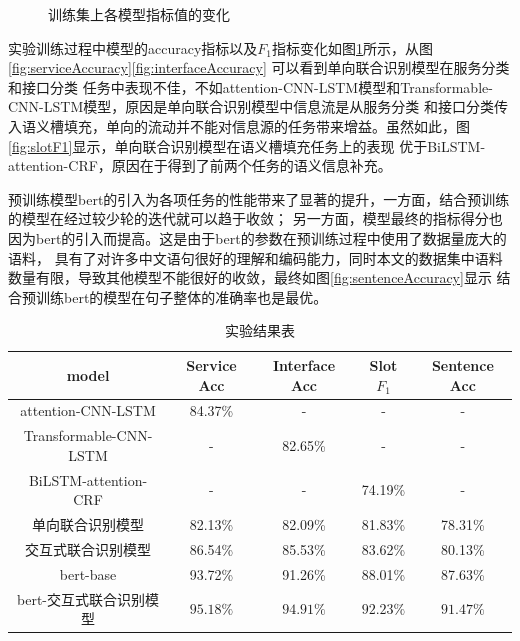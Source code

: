 \begin{figure}[htbp]
  \caption{训练集上各模型指标值的变化}
  \label{fig:4}
  \end{figure}

  实验训练过程中模型的accuracy指标以及$F_1$指标变化如图\ref{fig:4}所示，从图\ref{fig:serviceAccuracy}\ref{fig:interfaceAccuracy}
  可以看到单向联合识别模型在服务分类和接口分类
  任务中表现不佳，不如attention-CNN-LSTM模型和Transformable-CNN-LSTM模型，原因是单向联合识别模型中信息流是从服务分类
  和接口分类传入语义槽填充，单向的流动并不能对信息源的任务带来增益。虽然如此，图\ref{fig:slotF1}显示，单向联合识别模型在语义槽填充任务上的表现
  优于BiLSTM-attention-CRF，原因在于得到了前两个任务的语义信息补充。

  预训练模型bert的引入为各项任务的性能带来了显著的提升，一方面，结合预训练的模型在经过较少轮的迭代就可以趋于收敛；
  另一方面，模型最终的指标得分也因为bert的引入而提高。这是由于bert的参数在预训练过程中使用了数据量庞大的语料，
  具有了对许多中文语句很好的理解和编码能力，同时本文的数据集中语料数量有限，导致其他模型不能很好的收敛，最终如图\ref{fig:sentenceAccuracy}显示
  结合预训练bert的模型在句子整体的准确率也是最优。

  \begin{table}[htb]
    \centering
    \caption{实验结果表}
    \label{tab:jieguo}
\begin{tabular}{c|cccc}
  \hline
   model&Service Acc&Interface Acc&Slot $F_1$&Sentence Acc\\
   \hline
   attention-CNN-LSTM&84.37\%&-&-&-\\
   Transformable-CNN-LSTM&-&82.65\%&-&-\\
   BiLSTM-attention-CRF&-&-&74.19\%&-\\
   单向联合识别模型&82.13\%&82.09\%&81.83\%&78.31\%\\
   交互式联合识别模型&86.54\%&85.53\%&83.62\%&80.13\%\\
   bert-base&93.72\%&91.26\%&88.01\%&87.63\%\\
   bert-交互式联合识别模型&$\mathbf{95.18\%}$&$\mathbf{94.91}\%$&$\mathbf{92.23}\%$&$\mathbf{91.47}\%$\\
  \hline
  \end{tabular}
\end{table}

